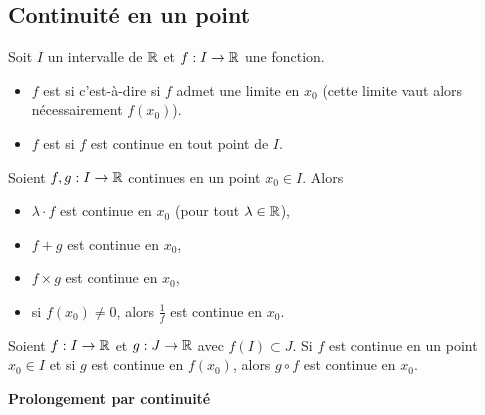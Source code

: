 \documentclass[10pt,class=article,crop=false]{standalone}
\begin{document}
\begin{multicols}{2}

	
\subsection{Continuité en un point}



Soit $I$ un intervalle de $\mathbb{R}$ et $f:I\to\mathbb{R}$ une fonction.
\begin{itemize}
	\item $f$ est  si
	c'est-à-dire si $f$ admet une limite en $x_0$ (cette limite vaut alors nécessairement $f(x_0)$).
	
	\item $f$ est  si $f$ est continue en tout point de $I$.
\end{itemize}






\begin{proposition}
Soient $f,g:I\to\mathbb{R}$ continues en un point $x_0\in I$. Alors
\begin{itemize}
	\item $\lambda\cdot f$ est continue en $x_0$ (pour tout $\lambda\in\mathbb{R}$),
	\item $f+g$ est continue en $x_0$,
	\item $f\times g$ est continue en $x_0$,
	\item si $f(x_0)\neq 0$, alors $\frac1f$ est continue en $x_0$.
\end{itemize}
\end{proposition}

\begin{proposition}
Soient $f:I\to\mathbb{R}$ et $g:J\to\mathbb{R}$ avec $f(I)\subset J$.
Si $f$ est continue en un point $x_0\in I$ et si $g$ est continue en $f(x_0)$,
alors $g\circ f$ est continue en $x_0$.
\end{proposition}

\textbf{Prolongement par continuité}


\end{multicols}
\end{document}
